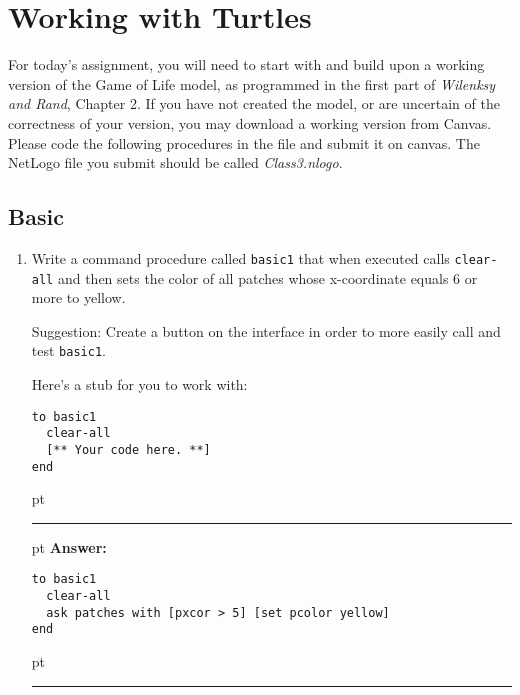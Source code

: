 \documentclass[11pt]{book}
\begin{document}
\chapter{Working with Turtles}

For today's assignment, you will need to start with and build upon a working version of the Game of Life model, as programmed in the first part of {\it Wilenksy and Rand}, Chapter 2. If you have not created the model, or are uncertain of the correctness of your version, you may download a working version from Canvas. Please code the following procedures in the file and submit it on canvas. The NetLogo file you submit should be called {\it Class3.nlogo}.

\section{Basic}

\begin{enumerate}
\item Write a command procedure called \texttt{basic1} that when executed calls \texttt{clear-all} and then sets the color of all patches whose x-coordinate equals 6 or more to yellow. 

Suggestion: Create a button on the interface in order to more easily call and test \texttt{basic1}.

Here's a stub for you to work with:
\begin{verbatim}
to basic1
  clear-all
  [** Your code here. **]
end
\end{verbatim}


\ifnum{}
 pt
\hrule
{} pt
{\bf Answer: }
\begin{verbatim}
to basic1
  clear-all
  ask patches with [pxcor > 5] [set pcolor yellow]
end
\end{verbatim}
 pt
\hrule
\fi

\end{enumerate}

%


%
\end{document}
